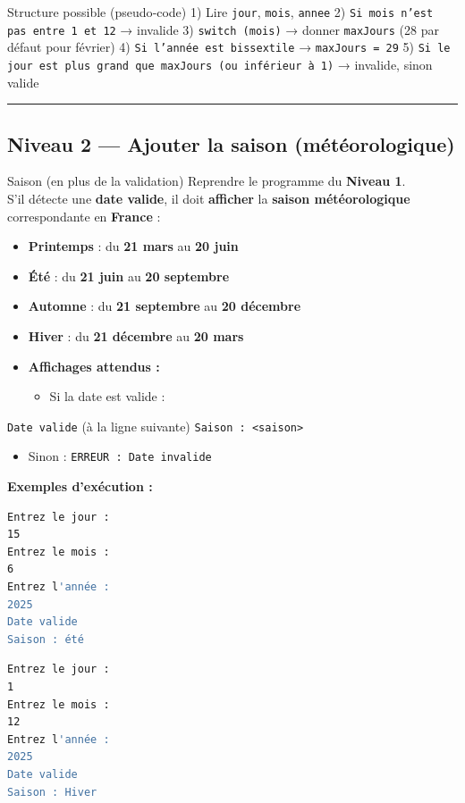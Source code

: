 \begin{UPSTIinfor}{Structure possible (pseudo‑code)}
	1) Lire \texttt{jour}, \texttt{mois}, \texttt{annee}
	2) \texttt{Si mois n'est pas entre 1 et 12} → invalide
	3) \texttt{switch (mois)} → donner \texttt{maxJours} (28 par défaut pour février)
	4) \texttt{Si l'année est bissextile} → \texttt{maxJours = 29}
	5) \texttt{Si le jour est plus grand que maxJours (ou inférieur à 1)} → invalide, sinon valide
\end{UPSTIinfor}
\hrule
\subsection{Niveau 2 — Ajouter la saison (météorologique)}

\begin{UPSTIManipulation}{Saison (en plus de la validation)}
	Reprendre le programme du \textbf{Niveau 1}. \\
	S’il détecte une \textbf{date valide}, il doit \textbf{afficher} la \textbf{saison météorologique} correspondante en \textbf{France} :
	\begin{itemize}
		\item \textbf{Printemps} : du \textbf{21 mars} au \textbf{20 juin}
		\item \textbf{Été} : du \textbf{21 juin} au \textbf{20 septembre}
		\item \textbf{Automne} : du \textbf{21 septembre} au \textbf{20 décembre}
		\item \textbf{Hiver} : du \textbf{21 décembre} au \textbf{20 mars}
	\end{itemize}

	\begin{itemize}
		\item \textbf{Affichages attendus :}
		      \begin{itemize}
			      \item Si la date est valide :
		      \end{itemize}
	\end{itemize}
	\texttt{Date valide} (à la ligne suivante) \texttt{Saison : <saison>}
	\begin{itemize}
		\item Sinon : \texttt{ERREUR : Date invalide}
	\end{itemize}
	\textbf{Exemples d’exécution :}
	\begin{lstlisting}[language=bash]
Entrez le jour :
15
Entrez le mois :
6
Entrez l'année :
2025
Date valide
Saison : été
\end{lstlisting}
	\begin{lstlisting}[language=bash]
Entrez le jour :
1
Entrez le mois :
12
Entrez l'année :
2025
Date valide
Saison : Hiver
\end{lstlisting}
\end{UPSTIManipulation}